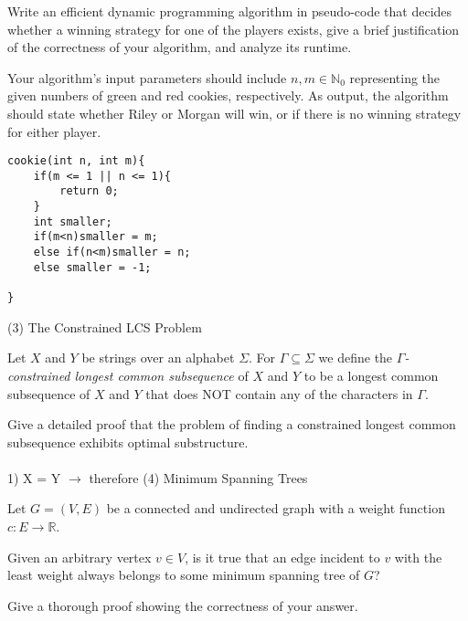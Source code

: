 \documentclass[11pt]{amsart}
\begin{document}
Write an efficient dynamic programming algorithm in pseudo-code that decides whether a winning strategy for one of the players exists,
give a brief justification of the correctness of your algorithm, and analyze its runtime.\medskip

Your algorithm's input parameters should include $n, m \in \mathbb{N}_0$ representing the given numbers of green 
and red cookies, respectively. As output, the algorithm should state whether Riley or Morgan will win, or if there is no
winning strategy for either player.\\
\newpage
\begin{lstlisting}
cookie(int n, int m){
    if(m <= 1 || n <= 1){
        return 0;
    }
    int smaller;
    if(m<n)smaller = m;
    else if(n<m)smaller = n;
    else smaller = -1;
    
}
\end{lstlisting}
\newpage
(3) The Constrained LCS Problem\medskip

Let $X$ and $Y$ be strings over an alphabet $\Sigma$. For $\Gamma\subseteq \Sigma$ we define the \emph{$\Gamma$-constrained longest common subsequence } of $X$ and $Y$ to be a longest common subsequence of $X$ and $Y$ that does NOT 
contain any of the characters in $\Gamma$.\medskip

Give a detailed proof that the problem of finding a constrained longest common subsequence exhibits optimal substructure.\\
\\
1) X = Y $\rightarrow$ therefore  
\newpage
(4) Minimum Spanning Trees\medskip

Let $G=(V,E)$ be a connected and undirected graph with a weight function $c\colon E \to \mathbb{R}$. \medskip

Given an arbitrary vertex $v\in V$, is it true that an edge incident to $v$ with the least weight always belongs to some minimum spanning tree of $G$?\medskip

Give a thorough proof showing the correctness of your answer. 
\newpage
\begin{lstlisting}
\end{lstlisting}
\end{document}
